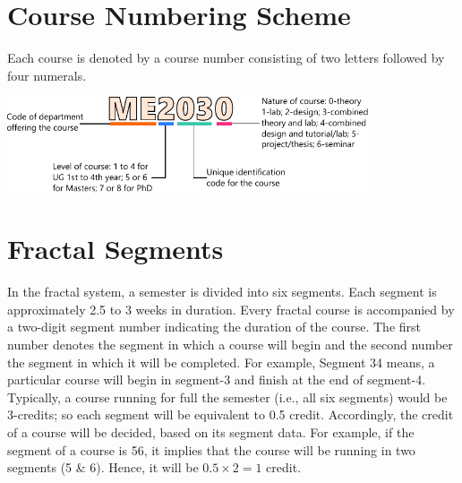 \section{Course Numbering Scheme}
Each course is denoted by a course number consisting of two letters followed by four numerals.
\begin{center}
    \includegraphics[width=0.8\textwidth, angle=0]{./parts/code-explain.pdf}
\end{center}


\section{Fractal Segments}
In the fractal system, a semester is divided into six segments. Each segment is approximately 2.5 to 3 weeks in duration. Every fractal course is accompanied by a two-digit segment number indicating the duration of the course. The first number denotes the segment in which a course will begin and the second number the segment in which it will be completed. For example, Segment 34 means, a particular course will begin in segment-3 and finish at the end of segment-4. Typically, a course running for full the semester (i.e., all six segments) would be 3-credits; so each segment will be equivalent to 0.5 credit. Accordingly, the credit of a course will be decided, based on its segment data. For example, if the segment of a course is 56, it implies that the course will be running in two segments (5 \& 6). Hence, it will be $0.5 \times 2 = 1$ credit. 

